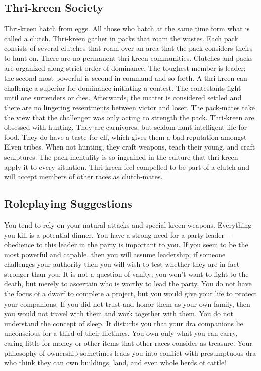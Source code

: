 \documentclass[10pt,a4paper,twocolumn]{d20}
\begin{document}
{\subsection{Thri-kreen Society}
Thri‐kreen hatch from eggs. All those who hatch at the same time form what is called a clutch. Thri‐kreen gather in packs that roam the wastes. Each pack consists of several clutches that roam over an area that the pack considers theirs to hunt on. There are no permanent thri‐kreen communities.
Clutches and packs are organized along strict order of dominance. The toughest member is leader; the second most powerful is second in command and so forth. A thri‐kreen can challenge a superior for dominance initiating a contest. The contestants fight until one surrenders or dies. Afterwards, the matter is considered settled and there are no lingering resentments between victor and loser. The pack‐mates take the view that the challenger was only acting to strength the pack.
Thri‐kreen are obsessed with hunting. They are carnivores, but seldom hunt intelligent life for food. They do have a taste for elf, which gives them a bad reputation amongst Elven tribes. When not hunting, they craft weapons, teach their young, and craft sculptures.
The pack mentality is so ingrained in the culture that thri‐kreen apply it to every situation. Thri‐kreen feel compelled to be part of a clutch and will accept members of other races as clutch‐mates.
\subsection{Roleplaying Suggestions}
You tend to rely on your natural attacks and special kreen weapons. Everything you kill is a potential dinner. You have a strong need for a party leader – obedience to this leader in the party is important to you. If you seem to be the most powerful and capable, then you will assume leadership; if someone challenges your authority then you will wish to test whether they are in fact stronger than you. It is not a question of vanity; you won’t want to fight to the death, but merely to ascertain who is worthy to lead the party. You do not have the focus of a dwarf to complete a project, but you would give your life to protect your companions. If you did not trust and honor them as your own family, then you would not travel with them and work together with them. You do not understand the concept of sleep. It disturbs you that your dra companions lie unconscious for a third of their lifetimes. You own only what you can carry, caring little for money or other items that other races consider as treasure. Your philosophy of ownership sometimes leads you into conflict with presumptuous dra who think they can own buildings, land, and even whole herds of cattle!
}
\end{document}
